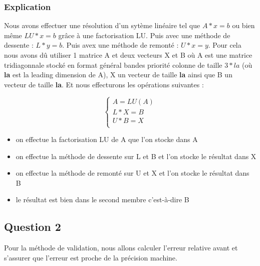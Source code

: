 \documentclass[11pt]{article}
\begin{document}
\subsubsection{Explication}

Nous avons effectuer une résolution d'un sytème linéaire tel que $A *
x = b$ ou bien même $LU * x = b $ grâce à une factorisation
LU.\newline
\vspace{5mm}
Puis avec une méthode de dessente : $ L * y = b $.\newline
Puis avex une méthode de remonté : $ U * x = y $.\newline
\vspace{5mm}
Pour cela nous avons dû utiliser 1 matrice A et deux vecteurs X et B
où A est une matrice tridiagonnale stocké en format général bandes 
priorité colonne de taille $3 * la$ (où \textbf{la} est la leading dimension de
A), X un vecteur de taille \textbf{la} ainsi que B un vecteur de
taille \textbf{la}.\newline
\vspace{5mm}
Et nous effecturons les opérations suivantes :

\begin{equation*}
  \left\{
  \begin{array}{l}
    A = LU(A) \\
    L * X = B \\
    U * B = X \\
  \end{array}
  \right.
\end{equation*}

\begin{itemize}
\item on effectue la factorisation LU de A que l'on stocke dans A
\item on effectue la méthode de dessente sur L et B et l'on stocke le
  résultat dans X
\item on effectue la méthode de remonté sur U et X et l'on stocke le
  résultat dans B
\item le résultat est bien dans le second membre c'est-à-dire B
\end{itemize}

\subsection{Question 2}

Pour la méthode de validation, nous allons calculer l'erreur relative
avant et s'assurer que l'erreur est proche de la précision machine.
\end{document}
